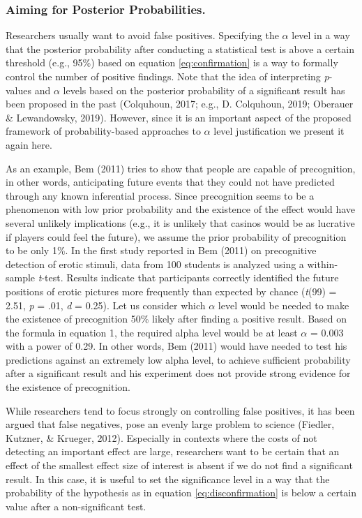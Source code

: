 \documentclass[
  english,
  ,jou,floatsintext]{apa6}
\begin{document}
\hypertarget{aiming-for-posterior-probabilities.}{%
\subsubsection{Aiming for Posterior Probabilities.}\label{aiming-for-posterior-probabilities.}}

Researchers usually want to avoid false positives. Specifying the \(\alpha\) level in a way that the posterior probability after conducting a statistical test is above a certain threshold (e.g., 95\%) based on equation \ref{eq:confirmation} is a way to formally control the number of positive findings. Note that the idea of interpreting \emph{p}-values and \(\alpha\) levels based on the posterior probability of a significant result has been proposed in the past (Colquhoun, 2017; e.g., D. Colquhoun, 2019; Oberauer \& Lewandowsky, 2019). However, since it is an important aspect of the proposed framework of probability-based approaches to \(\alpha\) level justification we present it again here.

As an example, Bem (2011) tries to show that people are capable of precognition, in other words, anticipating future events that they could not have predicted through any known inferential process. Since precognition seems to be a phenomenon with low prior probability and the existence of the effect would have several unlikely implications (e.g., it is unlikely that casinos would be as lucrative if players could feel the future), we assume the prior probability of precognition to be only 1\%. In the first study reported in Bem (2011) on precognitive detection of erotic stimuli, data from 100 students is analyzed using a within-sample \emph{t}-test. Results indicate that participants correctly identified the future positions of erotic pictures more frequently than expected by chance (\emph{t}(99) = 2.51, \emph{p} = .01, \emph{d} = 0.25).
Let us consider which \(\alpha\) level would be needed to make the existence of precognition 50\% likely after finding a positive result.
Based on the formula in equation 1, the required alpha level would be at least \(\alpha\) = 0.003 with a power of 0.29. In other words, Bem (2011) would have needed to test his predictions against an extremely low alpha level, to achieve sufficient probability after a significant result and his experiment does not provide strong evidence for the existence of precognition.

While researchers tend to focus strongly on controlling false positives, it has been argued that false negatives, pose an evenly large problem to science (Fiedler, Kutzner, \& Krueger, 2012). Especially in contexts where the costs of not detecting an important effect are large, researchers want to be certain that an effect of the smallest effect size of interest is absent if we do not find a significant result. In this case, it is useful to set the significance level in a way that the probability of the hypothesis as in equation \ref{eq:disconfirmation} is below a certain value after a non-significant test.
\end{document}
